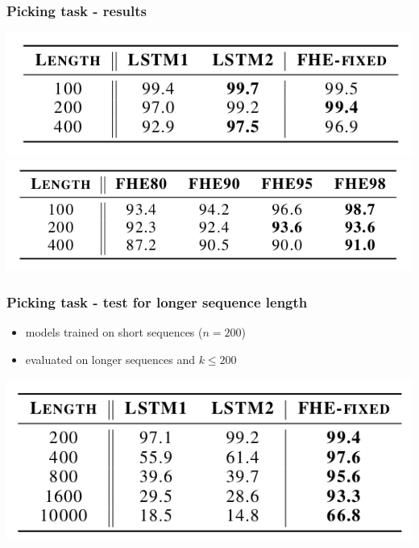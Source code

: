\documentclass{beamer}
\begin{document}
\begin{frame}
    \frametitle{Picking task - results}
    \begin{center}
        \includegraphics[scale=1.8]{img/picking-table2.png}
        \includegraphics[scale=1.8]{img/picking-table3.png}
    \end{center}
\end{frame}

\begin{frame}
    \frametitle{Picking task - test for longer sequence length}
    \begin{itemize}
        \item models trained on short sequences ($n=200$)
        \item evaluated on longer sequences and $k \le 200$
    \end{itemize}
    \begin{center}
        \includegraphics[scale=1.8]{img/picking-table4.png}
    \end{center}
\end{frame}
\end{document}
